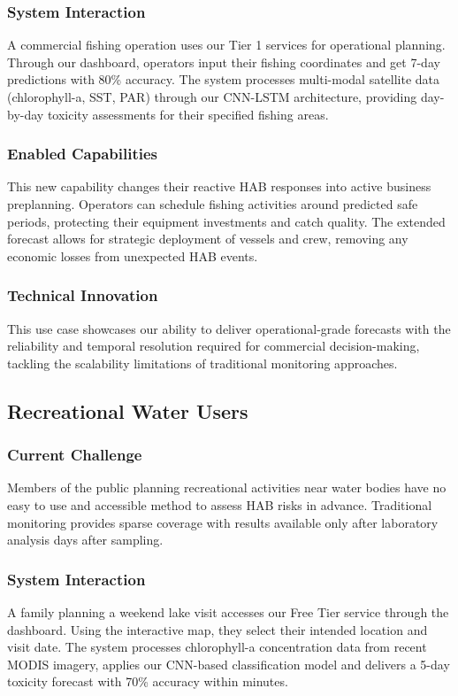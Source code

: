 \documentclass[conference]{IEEEtran}
\begin{document}
\subsubsection{System Interaction}
A commercial fishing operation uses our Tier 1 services for operational planning. Through our dashboard, operators input their fishing coordinates and get 7-day predictions with 80\% accuracy. The system processes multi-modal satellite data (chlorophyll-a, SST, PAR) through our CNN-LSTM architecture, providing day-by-day toxicity assessments for their specified fishing areas.
\subsubsection{Enabled Capabilities}
This new capability changes their reactive HAB responses into active business preplanning. Operators can schedule fishing activities around predicted safe periods, protecting their equipment investments and catch quality. The extended forecast allows for strategic deployment of vessels and crew, removing any economic losses from unexpected HAB events.
\subsubsection{Technical Innovation}
This use case showcases our ability to deliver operational-grade forecasts with the reliability and temporal resolution required for commercial decision-making, tackling the scalability limitations of traditional monitoring approaches.

\subsection{Recreational Water Users}
\subsubsection{Current Challenge}
Members of the public planning recreational activities near water bodies have no easy to use and accessible method to assess HAB risks in advance. Traditional monitoring provides sparse coverage with results available only after laboratory analysis days after sampling.
\subsubsection{System Interaction}
A family planning a weekend lake visit accesses our Free Tier service through the dashboard. Using the interactive map, they select their intended location and visit date. The system processes chlorophyll-a concentration data from recent MODIS imagery, applies our CNN-based classification model and delivers a 5-day toxicity forecast with 70\% accuracy within minutes.
\end{document}
